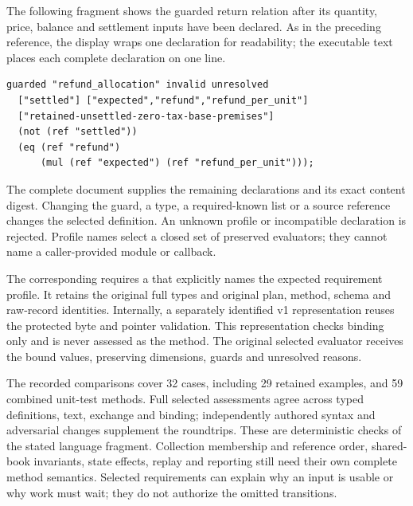 The following fragment shows the guarded return relation after its quantity,
price, balance and settlement inputs have been declared. As in the preceding
reference, the display wraps one declaration for readability; the executable
text places each complete declaration on one line.
\begin{lstlisting}
guarded "refund_allocation" invalid unresolved
  ["settled"] ["expected","refund","refund_per_unit"]
  ["retained-unsettled-zero-tax-base-premises"]
  (not (ref "settled"))
  (eq (ref "refund")
      (mul (ref "expected") (ref "refund_per_unit")));
\end{lstlisting}
The complete document supplies the remaining declarations and its exact content
digest. Changing the guard, a type, a required-known list or a source reference
changes the selected definition. An unknown profile or incompatible declaration
is rejected. Profile names select a closed set of preserved evaluators; they
cannot name a caller-provided module or callback.

The corresponding  requires a
 that explicitly names the expected requirement
profile. It retains the original full types and original plan, method, schema
and raw-record identities. Internally, a separately identified v1 representation
reuses the protected byte and pointer validation. This representation checks
binding only and is never assessed as the method. The original selected evaluator
receives the bound values, preserving dimensions, guards and unresolved reasons.

The recorded comparisons cover 32 cases, including 29 retained examples, and
59 combined unit-test methods. Full selected assessments agree across typed
definitions, text, exchange and binding; independently authored syntax and
adversarial changes supplement the roundtrips. These are deterministic checks
of the stated language fragment. Collection membership and reference order,
shared-book invariants, state effects, replay and reporting still need their
own complete method semantics. Selected requirements can explain why an input
is usable or why work must wait; they do not authorize the omitted transitions.
